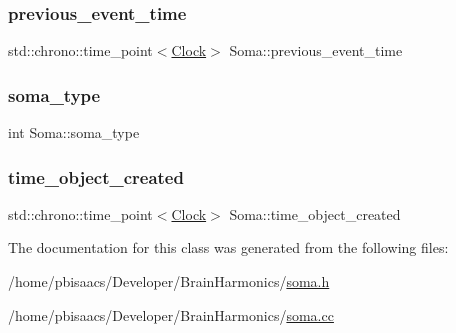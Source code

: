 \mbox{\label{classSoma_ab6204961b77d4224199eec0b105e41dd}} 
\subsubsection{\texorpdfstring{previous\+\_\+event\+\_\+time}{previous\_event\_time}}
{\footnotesize\ttfamily std\+::chrono\+::time\+\_\+point$<$\mbox{\hyperlink{universe_8h_a0ef8d951d1ca5ab3cfaf7ab4c7a6fd80}{Clock}}$>$ Soma\+::previous\+\_\+event\+\_\+time\hspace{0.3cm}{\ttfamily [private]}}

\mbox{\label{classSoma_ada423d58bc25a27df2a68adffb13718b}} 
\subsubsection{\texorpdfstring{soma\+\_\+type}{soma\_type}}
{\footnotesize\ttfamily int Soma\+::soma\+\_\+type\hspace{0.3cm}{\ttfamily [private]}}

\mbox{\label{classSoma_ac0e5b4b952e136b8a6c4c69f607ce4da}} 
\subsubsection{\texorpdfstring{time\+\_\+object\+\_\+created}{time\_object\_created}}
{\footnotesize\ttfamily std\+::chrono\+::time\+\_\+point$<$\mbox{\hyperlink{universe_8h_a0ef8d951d1ca5ab3cfaf7ab4c7a6fd80}{Clock}}$>$ Soma\+::time\+\_\+object\+\_\+created\hspace{0.3cm}{\ttfamily [private]}}



The documentation for this class was generated from the following files\+:\begin{DoxyCompactItemize}
\item 
/home/pbisaacs/\+Developer/\+Brain\+Harmonics/\mbox{\hyperlink{soma_8h}{soma.\+h}}\item 
/home/pbisaacs/\+Developer/\+Brain\+Harmonics/\mbox{\hyperlink{soma_8cc}{soma.\+cc}}\end{DoxyCompactItemize}
